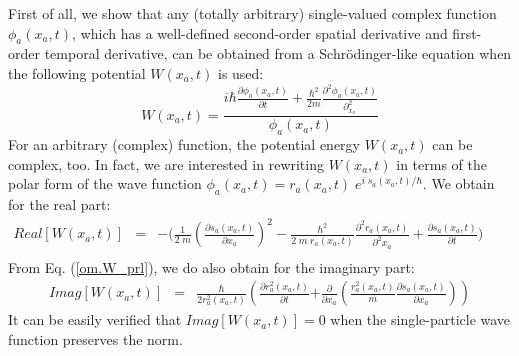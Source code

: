 \documentclass[nofootinbib, secnumarabic, amsmath, nobibnotes,10pt,aps,pra]{revtex4-1}
\newcommand{\eref}[1]{Eq. (\ref{#1})}
\begin{document}
First of all, we show that any (totally arbitrary) single-valued complex function $\phi_a(x_a,t)$, which has a well-defined second-order spatial derivative and first-order temporal derivative, can be obtained from a Schr\"odinger-like equation when the following potential $W(x_{a},t)$ is used:\vspace*{-6pt}
\begin{equation}
\label{om.W_prl}
W(x_{a},t) = \frac {i\hbar\frac{\partial \phi_{a}(x_{a},t)}{\partial t} + \frac{\hbar^2}{2m}\frac{\partial^2\phi_{a}(x_{a},t) }{\partial_{x_a}^2}} {\phi_{a}(x_{a},t)}
\end{equation}
For an arbitrary (complex) function, the potential energy
$W(x_{a},t)$ can be complex, too. In fact, we are interested in rewriting  $W(x_{a},t)$ in terms of the polar form of the wave
function $\phi_a(x_a,t) = r_a(x_a,t) \; e^{i \; s_a(x_a,t)/\hbar}$.
We obtain for the real part:
\begin{eqnarray}
\label{om.ReW_prl}
{Real}[W(x_{a},t)] &=& - \Bigg( \frac {1} {2 \; m} \left (\frac {\partial s_a(x_a,t)} {\partial x_a} \right)^2-\frac{\hbar^2} {2 \; m \; r_a(x_a,t)}
\frac {\partial^2 r_a(x_a,t)} {\partial^2 x_a}
 + \frac {\partial s_a(x_a,t)} {\partial t} \Bigg)\qquad\nonumber\\
\end{eqnarray}
From \eref{om.W_prl}, we do also obtain  for the imaginary part:
\begin{eqnarray}
\label{om.ImW_prl}
\textit{Imag}[W(x_{a},t)] &=& \frac{\hbar}
{2r_a^2(x_a,t)}\!\! \left( \frac {\partial r_a^2(x_a,t)} {\partial
t}\right.\left. + \frac {\partial} {\partial x_a} \left( \frac {r_a^2(x_a,t)} {m}
\frac {\partial s_a(x_a,t)} {\partial x_a} \right) \right)
\end{eqnarray}
It can be easily verified that $\textit{Imag}[W(x_{a},t)] = 0$ when the single-particle wave function preserves the norm.
\end{document}
